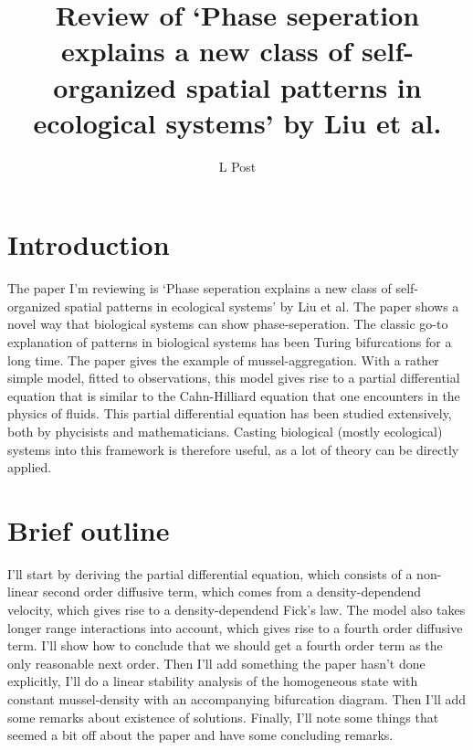 \documentclass[a4paper]{jpconf}
\begin{document}
\nocite{*}
\title{Review of `Phase seperation explains a new class of
self-organized spatial patterns in ecological systems' by Liu et al.}

\author{L Post}

\address{MSc in Physics and Mathematics, University of Amsterdam, NL}



\section{Introduction}

The paper I'm reviewing is `Phase seperation explains a new class of self-organized spatial patterns in ecological systems' by Liu et al. The paper shows a novel way that biological systems can show phase-seperation. The classic go-to explanation of patterns in biological systems has been Turing bifurcations for a long time. The paper gives the example of mussel-aggregation. With a rather simple model, fitted to observations, this model gives rise to a partial differential equation that is similar to the Cahn-Hilliard equation that one encounters in the physics of fluids. This partial differential equation has been studied extensively, both by phycisists and mathematicians. Casting biological (mostly ecological) systems into this framework is therefore useful, as a lot of theory can be directly applied. 
\section{Brief outline}
I'll start by deriving the partial differential equation, which consists of a non-linear second order diffusive term, which comes from a density-dependend velocity, which gives rise to a density-dependend Fick's law. The model also takes longer range interactions into account, which gives rise to a fourth order diffusive term. I'll show how to conclude that we should get a fourth order term as the only reasonable next order. Then I'll add something the paper hasn't done explicitly, I'll do a linear stability analysis of the homogeneous state with constant mussel-density with an accompanying bifurcation diagram. Then I'll add some remarks about existence of solutions. Finally, I'll note some things that seemed a bit off about the paper and have some concluding remarks.
\end{document}
